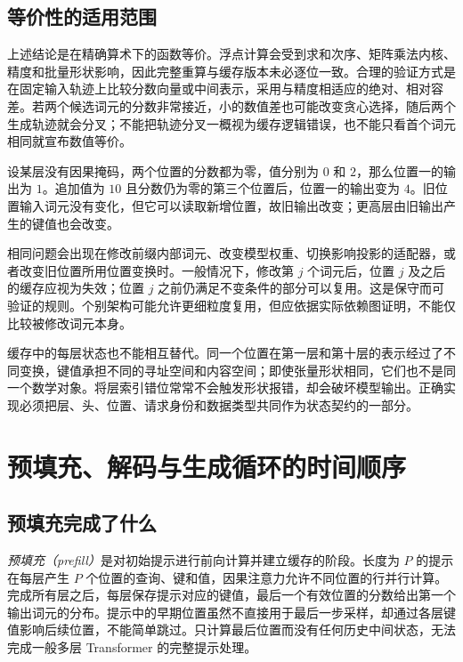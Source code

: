 \documentclass[UTF8,12pt,a4paper,fontset=fandol]{ctexart}
\begin{document}
\subsection{等价性的适用范围}

上述结论是在精确算术下的函数等价。浮点计算会受到求和次序、矩阵乘法内核、精度和批量形状影响，因此完整重算与缓存版本未必逐位一致。合理的验证方式是在固定输入轨迹上比较分数向量或中间表示，采用与精度相适应的绝对、相对容差。若两个候选词元的分数非常接近，小的数值差也可能改变贪心选择，随后两个生成轨迹就会分叉；不能把轨迹分叉一概视为缓存逻辑错误，也不能只看首个词元相同就宣布数值等价。

\begin{example}[双向注意力不能直接沿用同样的证明]
设某层没有因果掩码，两个位置的分数都为零，值分别为 $0$ 和 $2$，那么位置一的输出为 $1$。追加值为 $10$ 且分数仍为零的第三个位置后，位置一的输出变为 $4$。旧位置输入词元没有变化，但它可以读取新增位置，故旧输出改变；更高层由旧输出产生的键值也会改变。
\end{example}

相同问题会出现在修改前缀内部词元、改变模型权重、切换影响投影的适配器，或者改变旧位置所用位置变换时。一般情况下，修改第 $j$ 个词元后，位置 $j$ 及之后的缓存应视为失效；位置 $j$ 之前仍满足不变条件的部分可以复用。这是保守而可验证的规则。个别架构可能允许更细粒度复用，但应依据实际依赖图证明，不能仅比较被修改词元本身。

缓存中的每层状态也不能相互替代。同一个位置在第一层和第十层的表示经过了不同变换，键值承担不同的寻址空间和内容空间；即使张量形状相同，它们也不是同一个数学对象。将层索引错位常常不会触发形状报错，却会破坏模型输出。正确实现必须把层、头、位置、请求身份和数据类型共同作为状态契约的一部分。

\section{预填充、解码与生成循环的时间顺序}
\label{sec:kv-phases}

\subsection{预填充完成了什么}

\emph{预填充（prefill）}是对初始提示进行前向计算并建立缓存的阶段。长度为 $P$ 的提示在每层产生 $P$ 个位置的查询、键和值，因果注意力允许不同位置的行并行计算。完成所有层之后，每层保存提示对应的键值，最后一个有效位置的分数给出第一个输出词元的分布。提示中的早期位置虽然不直接用于最后一步采样，却通过各层键值影响后续位置，不能简单跳过。只计算最后位置而没有任何历史中间状态，无法完成一般多层 Transformer 的完整提示处理。
\end{document}
